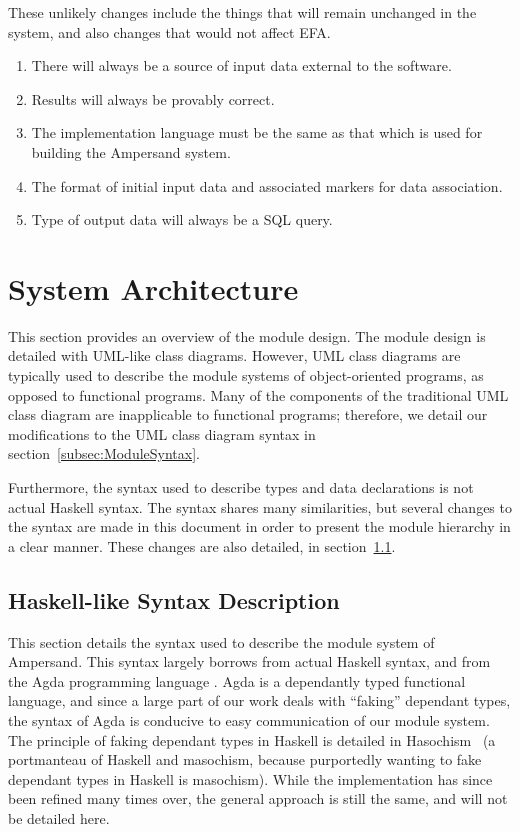 \documentclass[12pt, svgnames]{article}
\let\Oldsubsection\subsection
\renewcommand{\subsection}{\FloatBarrier\Oldsubsection}
\begin{document}
These unlikely changes include the things that will remain unchanged in the 
system, and also changes that would not affect EFA. 

\begin{enumerate}[label=\textbf{UC\arabic*:}]
    \item There will always be a source of input data external to the 
    software.
    \item Results will always be provably correct.
    \item The implementation language must be the same as that which is 
    used for building the Ampersand system.
    \item The format of initial input data and associated markers for 
    data association.
    \item Type of output data will always be a SQL query.
\end{enumerate}


\newpage
\section{System Architecture} \label{SystemArch}

This section provides an overview of the module design. The module design is
detailed with UML-like class diagrams. However, UML class diagrams are typically
used to describe the module systems of object-oriented programs, as opposed to
functional programs. Many of the components of the traditional UML class
diagram are inapplicable to functional programs; therefore, we detail our
modifications to the UML class diagram syntax in section~\ref{subsec:ModuleSyntax}. 

Furthermore, the syntax used to describe types and data declarations is not
actual Haskell syntax. The syntax shares many similarities, but several changes
to the syntax are made in this document in order to present the module hierarchy
in a clear manner. These changes are also detailed, in section~\ref{subsec:HaskellSyntax}. 


\subsection{Haskell-like Syntax Description}\label{subsec:HaskellSyntax}

This section details the syntax used to describe the module system of
Ampersand. This syntax largely borrows from actual Haskell syntax, and from the
Agda programming language \cite{agda}. Agda is a dependantly typed functional
language, and since a large part of our work deals with ``faking'' dependant
types, the syntax of Agda is conducive to easy communication of our module system. The
principle of faking dependant types in Haskell is detailed in
Hasochism~\cite{hasochism} (a portmanteau of Haskell and masochism, because
purportedly wanting to fake dependant types in Haskell is masochism). While the
implementation has since been refined many times over, the general approach is still the
same, and will not be detailed here.
\end{document}
